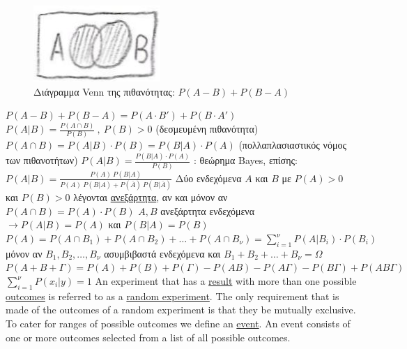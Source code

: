 \documentclass[12pt]{article}
\begin{document}
\begin{flushleft}
	\begin{figure}[H]
	\centering
	\includegraphics[scale=2]{pithanotita1}
	\caption{\textgreek{Διάγραμμα} Venn \textgreek{της πιθανότητας: } $P(A-B) + P(B-A)$}
	\label{fig:pithanotita1}
	\end{figure}
	
	\textbullet \quad $\displaystyle P(A-B) + P(B-A) = P(A \cdot B') + P(B\cdot A') $  \linebreak 
	\textbullet \quad $\displaystyle P(A|B) = \frac{P(A\cap B)}{P(B)}\ , \ P(B) > 0 $ \textgreek{(δεσμευμένη πιθανότητα)} \linebreak 	
	\textbullet \quad $\displaystyle P(A\cap B) = P(A|B) \cdot P(B) = P(B|A) \cdot P(A) $ \textgreek{(πολλαπλασιαστικός νόμος των πιθανοτήτων)} \linebreak 
	\textbullet \quad $\displaystyle P(A|B) = \frac{P(B|A) \cdot P(A)}{P(B)} $ \textgreek{: θεώρημα } Bayes, \textgreek{επίσης}: \linebreak 
	$ P(A|B) = \frac{P(A)\ P(B|A)}{P(A)\ P(B|A) + P(\overline{A})\ P(B|\overline{A})} $ \linebreak 
	\textbullet \quad \textgreek{Δύο ενδεχόμενα} $A$ \textgreek{και} $B$ \textgreek{με} $P(A) > 0 $ \textgreek{και} $P(B) > 0$ \textgreek{λέγονται} \uline{\textgreek{ανεξάρτητα}}, \textgreek{αν και μόνον αν} $P(A \cap B) = P(A) \cdot P(B) $ \linebreak 
	\textbullet \quad $A,B$ \textgreek{ανεξάρτητα ενδεχόμενα} $\rightarrow P(A|B) = P(A)$ \textgreek{και} $P(B|A) = P(B)$ \linebreak 
	\textbullet \quad $P(A) = P(A \cap B_1) + P(A \cap B_2) + \ldots + P(A \cap B_{\nu}) = \sum \limits_{i=1}^{\nu} P(A|B_i) \cdot P(B_i) $ \textgreek{μόνον αν} $B_1, B_2, \ldots, B_{\nu} $ \textgreek{ασυμβιβαστά ενδεχόμενα και } $B_1 + B_2 + \ldots + B_{\nu} = \Omega $ \linebreak 
	\textbullet \quad $P(A+B+ \Gamma) = P(A) + P(B) + P(\Gamma) - P(AB) - P(A\Gamma) - P(B\Gamma) + P(AB\Gamma) $ \linebreak 
	\textbullet \quad $ \sum \limits_{i=1}^{\nu} P(x_i | y) = 1$ \linebreak 
	\textbullet \quad An experiment that has a \uline{result} with more than one possible \uline{outcomes} is referred to as a \uline{random experiment}. The only requirement that is made of the outcomes of a random experiment is that they be mutually exclusive. To cater for ranges of possible outcomes we define an \uline{event}. An event consists of one or more outcomes selected from a list of all possible outcomes. \linebreak 
	

\end{flushleft}
\end{document}
